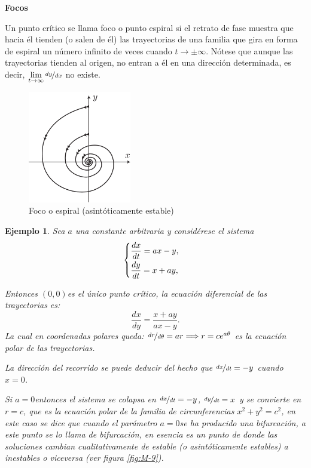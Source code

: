\documentclass[a5paper,doc,10pt,noapacite]{apa6}
\newtheorem{ejem}{Ejemplo}
\begin{document}
{{\newpage
%
	\textbf{Focos}\newline

Un punto crítico se llama foco o punto espiral si el retrato de fase muestra que hacia él tienden (o salen de él) las trayectorias de una familia que gira en forma de espiral un número infinito de veces cuando \(t\to\pm\infty\).	Nótese que aunque las trayectorias tienden al origen, no entran a él en una dirección determinada, es decir, \(\displaystyle\lim_{t\to\infty}\nicefrac{dy}{dx}\) no existe.

\vspace{-1\baselineskip}
	\begin{figure}[H]
		\captionsetup{justification=centering, labelfont=footnotesize, font=footnotesize}
		\centering
		\includegraphics[width=4.5cm]{Graficos/figura8}
		\caption{Foco o espiral (asintóticamente estable)}
		\label{fig:M-8}
	\end{figure}

\begin{ejem}
	Sea \(a\) una constante arbitraria y considérese el sistema
	\[
	\begin{cases}
		\dfrac{dx}{dt}=ax - y,\vspace{0.3em}
		\\
		\dfrac{dy}{dt}=x+ay,
	\end{cases}
	\]

	Entonces \((0,0)\)es el único punto crítico, la ecuación diferencial de las trayectorias es:
			\[
			\dfrac{dx}{dy}=\dfrac{x+ay}{ax-y}.
			\]
			La cual en coordenadas polares queda: \(\nicefrac{dr}{d\theta}=ar\Longrightarrow r=ce^{a\theta}\) es la ecuación polar de las trayectorias.
			
			La dirección del recorrido se puede deducir del hecho que \(\nicefrac{dx}{dt}=-y\) cuando \(x=0\).
			
			Si \(a=0\)entonces el sistema se colapsa en \(\nicefrac{dx}{dt}=-y\), \(\nicefrac{dy}{dt}=x\) y se convierte en \(r=c\), que es la ecuación polar de la familia de circunferencias \(x^2+y^2=c^2\), en este caso se dice que cuando el parámetro \(a=0\)se ha producido una bifurcación, a este punto se lo llama de bifurcación, en esencia es un punto de donde las soluciones cambian cualitativamente de estable (o asintóticamente estables) a inestables o viceversa (ver figura \ref{fig:M-9}).
	

\end{ejem}}}
\end{document}
